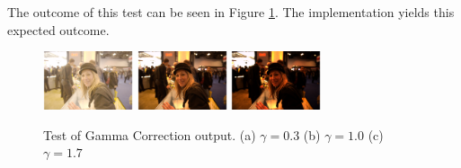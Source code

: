 \documentclass[10pt,a4paper]{article}
\begin{document}
The outcome of this test can be seen in Figure \ref{gammatest}. The implementation yields this expected outcome.

\begin{figure}
   \centering
   \subfigure
   {
       \includegraphics[width=100px]{gammacorrectionlow}
   }
   \subfigure
   {
       \includegraphics[width=100px]{gammacorrection_normal}
   }
   \subfigure
   {
       \includegraphics[width=100px]{gammacorrectionhigh}
   }
   \caption{
       Test of Gamma Correction output. 
       (a) $\gamma = 0.3$
       (b) $\gamma = 1.0$
       (c) $\gamma = 1.7$
   }
   \label{gammatest}
\end{figure}


\end{document}
